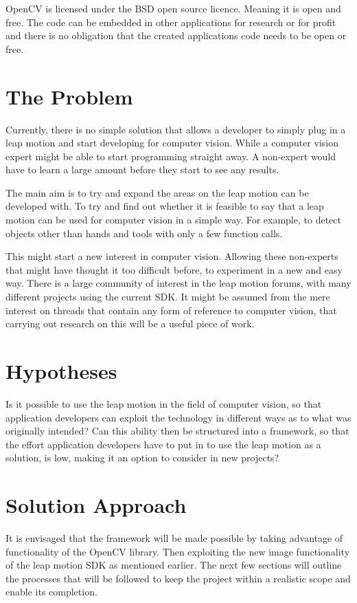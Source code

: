 \documentclass[11pt,oneside]{report}
\begin{document}
				OpenCV is licensed under the BSD open source licence.
				Meaning it is open and free.
				The code can be embedded in other applications for research or for profit and there is no obligation that the created applications code needs to be open or free.
		\section{The Problem}
				Currently, there is no simple solution that allows a developer to simply plug in a leap motion and start developing for computer vision.
				While a computer vision expert might be able to start programming straight away.
				A non-expert would have to learn a large amount before they start to see any results.	
				
				The main aim is to try and expand the areas on the leap motion can be developed with.
				To try and find out whether it is feasible to say that a leap motion can be used for computer vision in a simple way.
				For example, to detect objects other than hands and tools with only a few function calls.
				
				This might start a new interest in computer vision.
				Allowing these non-experts that might have thought it too difficult before, to experiment in a new and easy way.
				There is a large community of interest in the leap motion forums, with many different projects using the current SDK.
				It might be assumed from the mere interest on threads that contain any form of reference to computer vision, that carrying out research on this will be a useful piece of work.
		\section{Hypotheses}
				Is it possible to use the leap motion in the field of computer vision, so that application developers can exploit the technology in different ways as to what was originally intended?		
				Can this ability then be structured into a framework, so that the effort application developers have to put in to use the leap motion as a solution, is low, making it an option to consider in new projects?	
		\section{Solution Approach}	
			It is envisaged that the framework will be made possible by taking advantage of functionality of the OpenCV library.
			Then exploiting the new image functionality of the leap motion SDK as mentioned earlier.
			The next few sections will outline the processes that will be followed to keep the project within a realistic scope and enable its completion.
					
\end{document}
